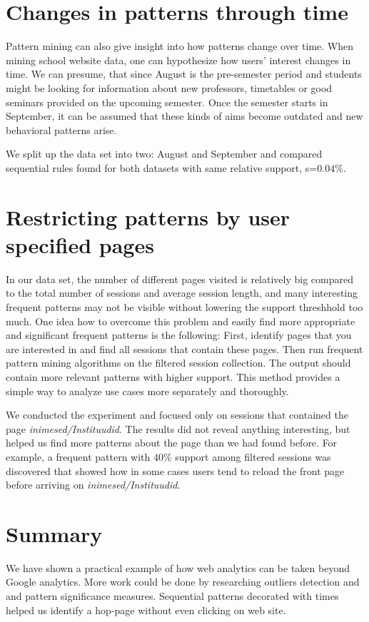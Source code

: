 \documentclass[english,a4paper]{article}
\begin{document}
\section{Changes in patterns through time} 
Pattern mining can also give insight into how patterns change over time. When mining school website data, one can hypothesize how users' interest changes in time. We can presume, that since August is the pre-semester period and students might be looking for information about new professors, timetables or good seminars provided on the upcoming semester. Once the semester starts in September, it can be assumed that these kinds of aims become outdated and new behavioral patterns arise.

We split up the data set into two: August and September and compared sequential rules found for both datasets with same relative support, s=$0.04\%$.









\section{Restricting patterns by user specified pages}

In our data set, the number of different pages visited is relatively big compared to the total number of sessions and average session length, and many interesting frequent patterns may not be visible without lowering the support threshhold too much. One idea how to overcome this problem and easily find more appropriate and significant frequent patterns is the following: First, identify pages that you are interested in and find all sessions that contain these pages. Then run frequent pattern mining algorithms on the filtered session collection. The output should contain more relevant patterns with higher support. This method provides a simple way to analyze use cases more separately and thoroughly.

We conducted the experiment and focused only on sessions that contained the page \emph{inimesed/Instituudid}. The results did not reveal anything interesting, but helped us find more patterns about the page than we had found before. For example, a frequent pattern with $40\%$ support among filtered sessions was discovered that showed how in some cases users tend to reload the front page before arriving on \emph{inimesed/Instituudid}.

\section{Summary}
We have shown a practical example of how web analytics can be taken beyond Google analytics.
More work could be done by researching outliers detection and and pattern significance measures.
Sequential patterns decorated with times helped us identify a hop-page without even clicking on web site.











\end{document}
